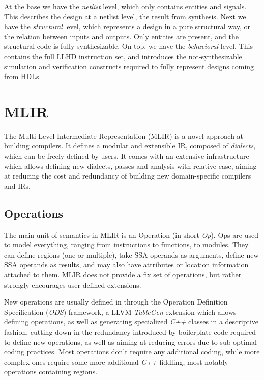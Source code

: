 At the base we have the \textit{netlist} level, which only contains entities and signals. This describes the design at a netlist level, the result from synthesis. Next we have the \textit{structural} level, which represents a design in a pure structural way, or the relation between inputs and outputs. Only entities are present, and the structural code is fully synthesizable. On top, we have the \textit{behavioral} level. This contains the full LLHD instruction set, and introduces the not-synthesizable simulation and verification constructs required to fully represent designs coming from HDLs.

\section{MLIR}
\label{section:mlir}
The Multi-Level Intermediate Representation (MLIR) \cite{Lattner2020} is a novel approach at building compilers. It defines a modular and extensible IR, composed of \textit{dialects}, which can be freely defined by users. It comes with an extensive infrastructure which allows defining new dialects, passes and analysis with relative ease, aiming at reducing the cost and redundancy of building new domain-specific compilers and IRs.
\subsection{Operations}
The main unit of semantics in MLIR is an Operation (in short \textit{Op}). Ops are used to model everything, ranging from instructions to functions, to modules.  They can define regions (one or multiple), take SSA operands as arguments, define new SSA operands as results, and may also have attributes or location information attached to them. MLIR does not provide a fix set of operations, but rather strongly encourages user-defined extensions.

New operations are usually defined in through the Operation Definition Specification (\textit{ODS}) framework, a LLVM \textit{TableGen} \cite{tablegen} extension which allows defining operations, as well as generating specialized \textit{C++} classes in a descriptive fashion, cutting down in the redundancy introduced by boilerplate code required to define new operations, as well as aiming at reducing errors due to sub-optimal coding practices. Most operations don't require any additional coding, while more complex ones require some more additional \textit{C++} fiddling, most notably operations containing regions.

